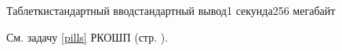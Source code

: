 \begin{problem}[(Эверстов В.\,В.)]{Таблетки}{стандартный ввод}{стандартный вывод}{1 секунда}{256 мегабайт}

См. задачу \ref{pills} РКОШП (стр. \pageref{pills}).

\end{problem}

